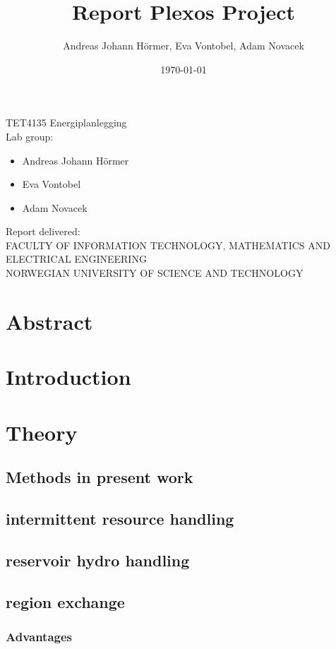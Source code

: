 \documentclass{article}
\title{Report Plexos Project}
\author{Andreas Johann H\"ormer, Eva Vontobel, Adam Novacek}
\date{\today}
\begin{document}
\thispagestyle{empty}
\maketitle
\thispagestyle{empty}
\begin{center}
TET4135 Energiplanlegging\\[3cm]
Lab group:
\begin{itemize}
\item Andreas Johann H\"ormer
\item Eva Vontobel
\item Adam Novacek\\[3cm]
\end{itemize}
Report delivered: \\[6cm]
FACULTY OF INFORMATION TECHNOLOGY, MATHEMATICS AND ELECTRICAL ENGINEERING\\
NORWEGIAN UNIVERSITY OF SCIENCE AND TECHNOLOGY
\end{center}
\thispagestyle{empty}
\newpage
\tableofcontents
\thispagestyle{empty}
\newpage
\section*{Abstract}
\thispagestyle{empty}

\newpage
\setcounter{page}{1}
\section{Introduction}

\section{Theory}
\subsection{Methods in present work}
\subsection{intermittent resource handling}
\subsection{reservoir hydro handling}
\subsection{region exchange}
\subsubsection{Advantages}
\end{document}
